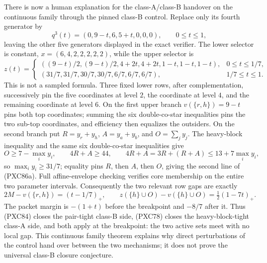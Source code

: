 \documentclass[11pt]{article}
\begin{document}
There is now a human explanation for the class-A/class-B handover on the
continuous family through the pinned class-B control.  Replace only its
fourth generator by
\[
 q^3(t)=(0,9-t,6,5+t,0,0,0),\qquad 0\le t\le1,
\]
leaving the other five generators displayed in the exact verifier.  The
lower selector is constant, $x=(6,4,2,2,2,2,2)$, while the upper selector is
\[
 z(t)=
 \begin{cases}
 ((9-t)/2,(9-t)/2,4+2t,4+2t,1-t,1-t,1-t),&0\le t\le1/7,\\
 (31/7,31/7,30/7,30/7,6/7,6/7,6/7),&1/7\le t\le1.
 \end{cases}                                         \tag{PXC86a}
\]
This is not a sampled formula.  Three fixed lower rows, after
complementation, successively pin the five coordinates at level $2$, the
coordinate at level $4$, and the remaining coordinate at level $6$.  On the
first upper branch $v(\{r,h\})=9-t$ pins both top coordinates; summing the six
double-co-star inequalities pins the two sub-top coordinates, and efficiency
then equalizes the outsiders.  On the second branch put
$R=y_r+y_h$, $A=y_a+y_b$, and $O=\sum_jy_j$.  The heavy-block inequality and
the same six double-co-star inequalities give
\[
 O\ge7-\max_i y_i,\qquad 4R+A\ge44,\qquad
 4R+A=3R+(R+A)\le13+7\max_i y_i,
\]
so $\max_i y_i\ge31/7$; equality pins $R$, then $A$, then $O$, giving the
second line of (PXC86a).  Full affine-envelope checking verifies core
membership on the entire two parameter intervals.  Consequently the two
relevant row gaps are exactly
\[
 2M-v(\{r,h\})=(t-1/7)_+,
 \qquad z(\{h\}\cup O)-v(\{h\}\cup O)=\tfrac12(1-7t)_+ .  \tag{PXC86}
\]
The packet margin is $-(1+t)$ before the breakpoint and $-8/7$ after it.
Thus (PXC84) closes the pair-tight class-B side, (PXC78) closes the
heavy-block-tight class-A side, and both apply at the breakpoint: the two
active sets meet with no local gap.  This continuous family theorem explains
why direct perturbations of the control hand over between the two mechanisms;
it does not prove the universal class-B closure conjecture.
\end{document}
